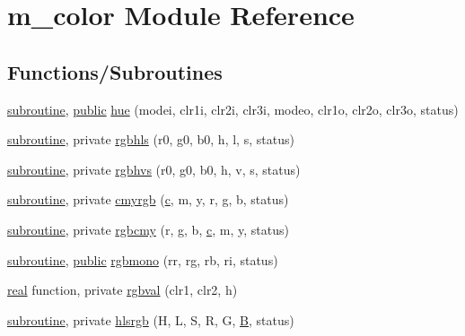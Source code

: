 \hypertarget{namespacem__color}{}\section{m\+\_\+color Module Reference}
\label{namespacem__color}
\subsection*{Functions/\+Subroutines}
\begin{DoxyCompactItemize}
\item 
\hyperlink{M__stopwatch_83_8txt_acfbcff50169d691ff02d4a123ed70482}{subroutine}, \hyperlink{M__stopwatch_83_8txt_a2f74811300c361e53b430611a7d1769f}{public} \hyperlink{namespacem__color_a56dd07bbf1378ccc78a230d171f9d429}{hue} (modei, clr1i, clr2i, clr3i, modeo, clr1o, clr2o, clr3o, status)
\item 
\hyperlink{M__stopwatch_83_8txt_acfbcff50169d691ff02d4a123ed70482}{subroutine}, private \hyperlink{namespacem__color_a1dd027cbe65112af243d26195b1fc49a}{rgbhls} (r0, g0, b0, h, l, s, status)
\item 
\hyperlink{M__stopwatch_83_8txt_acfbcff50169d691ff02d4a123ed70482}{subroutine}, private \hyperlink{namespacem__color_a76f00e1d418c4904a963094bc730a0e6}{rgbhvs} (r0, g0, b0, h, v, s, status)
\item 
\hyperlink{M__stopwatch_83_8txt_acfbcff50169d691ff02d4a123ed70482}{subroutine}, private \hyperlink{namespacem__color_ab91687e87d0901874e52efe5933e3044}{cmyrgb} (\hyperlink{c_8f90_aeb1f4e639be0213b4cbd07f2583a5b1f}{c}, m, y, r, g, b, status)
\item 
\hyperlink{M__stopwatch_83_8txt_acfbcff50169d691ff02d4a123ed70482}{subroutine}, private \hyperlink{namespacem__color_ad6e8505eef5add299c4475d289f3c5c5}{rgbcmy} (r, g, b, \hyperlink{c_8f90_aeb1f4e639be0213b4cbd07f2583a5b1f}{c}, m, y, status)
\item 
\hyperlink{M__stopwatch_83_8txt_acfbcff50169d691ff02d4a123ed70482}{subroutine}, \hyperlink{M__stopwatch_83_8txt_a2f74811300c361e53b430611a7d1769f}{public} \hyperlink{namespacem__color_aca19999686fc20d79da580c6a643dc35}{rgbmono} (rr, rg, rb, ri, status)
\item 
\hyperlink{read__watch_83_8txt_abdb62bde002f38ef75f810d3a905a823}{real} function, private \hyperlink{namespacem__color_a3e97e24dba7b820f685f13eaa64a6caa}{rgbval} (clr1, clr2, h)
\item 
\hyperlink{M__stopwatch_83_8txt_acfbcff50169d691ff02d4a123ed70482}{subroutine}, private \hyperlink{namespacem__color_a40e6c91da216384eded2157cdaf86eba}{hlsrgb} (H, L, S, R, G, \hyperlink{intro__blas1_83_8txt_a5f157716d3fd55e7b7e08312dc859b58}{B}, status)

\end{DoxyCompactItemize}
